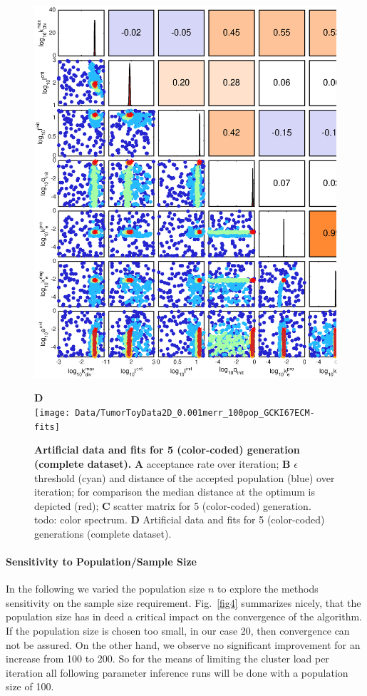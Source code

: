 \documentclass[10pt,letterpaper]{article}
\begin{document}
\begin{figure}[htbp]
\begin{minipage}[t]{0.66\textwidth}
\includegraphics[width=\textwidth]{Data/TumorToyData2D_0.001merr_100pop_GCKI67ECM-scatterPlotMatrix}
\end{minipage}
\textbf{D}\\
\texttt{[image: Data/TumorToyData2D\_0.001merr\_100pop\_GCKI67ECM-fits]}
\caption{{\bf Artificial data and fits for 5 (color-coded) generation (complete dataset).}
\textbf{A}  acceptance rate over iteration; \textbf{B} $\epsilon$ threshold (cyan) and distance of the accepted population (blue) over iteration; for comparison the median distance at the optimum is depicted (red); \textbf{C} scatter matrix for 5 (color-coded) generation. todo: color spectrum. \textbf{D} Artificial data and fits for 5 (color-coded) generations (complete dataset).}
\label{fig3}
\end{figure}


\paragraph{Sensitivity to Population/Sample Size}
In the following we varied the population size $n$ to explore the methods sensitivity on the sample size requirement. Fig.~\ref{fig4} summarizes nicely, that the population size has in deed a critical impact on the convergence of the algorithm. If the population size is chosen too small, in our case 20, then convergence can not be assured. On the other hand, we observe no significant improvement for an increase from 100 to 200. So for the means of limiting the cluster load per iteration all following parameter inference runs will be done with a population size of 100.
\end{document}
